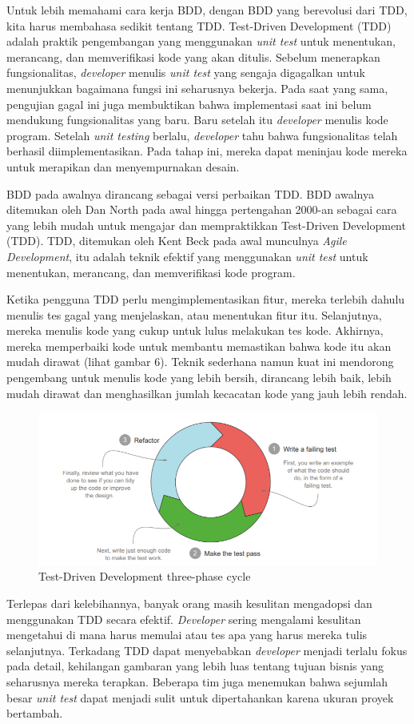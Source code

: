 \documentclass[a4paper,twoside]{article}
\begin{document}
\begin{enumerate}
Untuk lebih memahami cara kerja BDD, dengan BDD yang berevolusi dari TDD, kita harus membahasa sedikit tentang TDD. Test-Driven Development (TDD) adalah praktik pengembangan yang menggunakan \textit{unit test} untuk menentukan, merancang, dan memverifikasi kode yang akan ditulis. Sebelum menerapkan fungsionalitas, \textit{developer} menulis \textit{unit test} yang sengaja digagalkan untuk menunjukkan bagaimana fungsi ini seharusnya bekerja. Pada saat yang sama, pengujian gagal ini juga membuktikan bahwa implementasi saat ini belum mendukung fungsionalitas yang baru. Baru setelah itu \textit{developer} menulis kode program. Setelah \textit{unit testing} berlalu, \textit{developer} tahu bahwa fungsionalitas telah berhasil diimplementasikan. Pada tahap ini, mereka dapat meninjau kode mereka untuk merapikan dan menyempurnakan desain.

BDD pada awalnya dirancang sebagai versi perbaikan TDD. BDD awalnya ditemukan oleh Dan North pada awal hingga pertengahan 2000-an sebagai cara yang lebih mudah untuk mengajar dan mempraktikkan Test-Driven Development (TDD). TDD, ditemukan oleh Kent Beck pada awal munculnya \textit{Agile Development}, itu adalah teknik efektif yang menggunakan \textit{unit test} untuk menentukan, merancang, dan memverifikasi kode program.

Ketika pengguna TDD perlu mengimplementasikan fitur, mereka terlebih dahulu menulis tes gagal yang menjelaskan, atau menentukan fitur itu. Selanjutnya, mereka menulis kode yang cukup untuk lulus melakukan tes kode. Akhirnya, mereka memperbaiki kode untuk membantu memastikan bahwa kode itu akan mudah dirawat (lihat gambar 6). Teknik sederhana namun kuat ini mendorong pengembang untuk menulis kode yang lebih bersih, dirancang lebih baik, lebih mudah dirawat dan menghasilkan jumlah kecacatan kode yang jauh lebih rendah.

\begin{figure}
	\includegraphics[scale=1.2]{../DokumenSkripsi/gambar/bdd}
	\centering
	\caption{Test-Driven Development three-phase cycle}
\end{figure}
Terlepas dari kelebihannya, banyak orang masih kesulitan mengadopsi dan menggunakan TDD secara efektif. \textit{Developer} sering mengalami kesulitan mengetahui di mana harus memulai atau tes apa yang harus mereka tulis selanjutnya. Terkadang TDD dapat menyebabkan \textit{developer} menjadi terlalu fokus pada detail, kehilangan gambaran yang lebih luas tentang tujuan bisnis yang seharusnya mereka terapkan. Beberapa tim juga menemukan bahwa sejumlah besar \textit{unit test} dapat menjadi sulit untuk dipertahankan karena ukuran proyek bertambah.


\end{enumerate}
\end{document}

